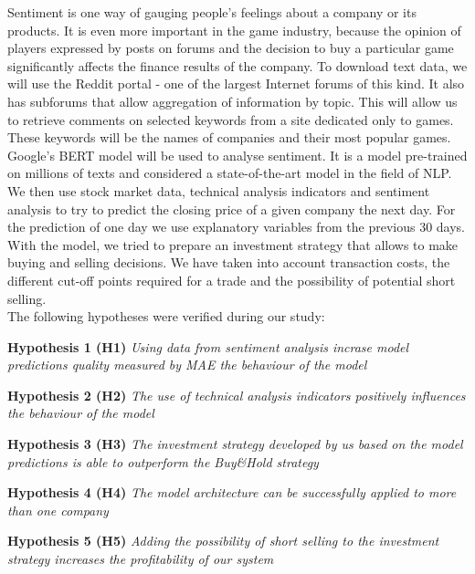 \documentclass[11pt]{article} %
\begin{document}
Sentiment is one way of gauging people's feelings about a company or its products. It is even more important in the game industry, because the opinion of players expressed by posts on forums and the decision to buy a particular game  significantly affects the finance results of the company. To download text data, we will use the Reddit portal - one of the largest Internet forums of this kind. It also has subforums that allow aggregation of information by topic. This will allow us to retrieve comments on selected keywords from a site dedicated only to games. These keywords will be the names of companies and their most popular games. \\

Google's BERT model will be used to analyse sentiment. It is a model pre-trained on millions of texts and considered a state-of-the-art model in the field of NLP. 
We then use stock market data, technical analysis indicators and sentiment analysis to try to predict the closing price of a given company the next day. For the prediction of one day we use explanatory variables from the previous 30 days. With the model, we tried to prepare an investment strategy that allows to make buying and selling decisions. We have taken into account transaction costs, the different cut-off points required for a trade and the possibility of potential short selling. \\

The following hypotheses were verified during our study: 

 \begin{flushleft}\textbf{Hypothesis 1 (H1)} \textit{Using data from sentiment analysis incrase model predictions quality measured by MAE the behaviour of the model }  \end{flushleft}
 \begin{flushleft}\textbf{Hypothesis 2 (H2)} \textit{The use of technical analysis indicators positively influences the behaviour of the model } \end{flushleft}
 \begin{flushleft}\textbf{Hypothesis 3 (H3)} \textit{The investment strategy developed by us based on the model predictions is able to outperform the Buy\&Hold strategy } \end{flushleft}
 \begin{flushleft}\textbf{Hypothesis 4 (H4)} \textit{The model architecture can be successfully applied to more than one company} \end{flushleft}
 \begin{flushleft}\textbf{Hypothesis 5 (H5)} \textit{Adding the possibility of short selling to the investment strategy increases the profitability of our system} \end{flushleft}
\end{document}
